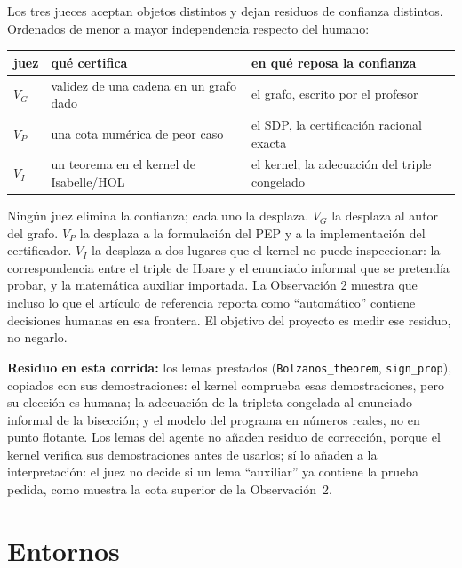 \documentclass[11pt,a4paper]{article}
\begin{document}
Los tres jueces aceptan objetos distintos y dejan residuos de confianza distintos. Ordenados de menor a mayor independencia respecto del humano:

\begin{center}
\begin{tabular}{@{}lll@{}}
\toprule
juez & qué certifica & en qué reposa la confianza \\
\midrule
$V_G$ & validez de una cadena en un grafo dado & el grafo, escrito por el profesor \\
$V_P$ & una cota numérica de peor caso & el SDP, la certificación racional exacta \\
$V_I$ & un teorema en el kernel de Isabelle/HOL & el kernel; la adecuación del triple congelado \\
\bottomrule
\end{tabular}
\end{center}

Ningún juez elimina la confianza; cada uno la desplaza. $V_G$ la desplaza al autor del grafo. $V_P$ la desplaza a la formulación del PEP y a la implementación del certificador. $V_I$ la desplaza a dos lugares que el kernel no puede inspeccionar: la correspondencia entre el triple de Hoare y el enunciado informal que se pretendía probar, y la matemática auxiliar importada. La Observación 2 muestra que incluso lo que el artículo de referencia reporta como ``automático'' contiene decisiones humanas en esa frontera. El objetivo del proyecto es medir ese residuo, no negarlo.

\textbf{Residuo en esta corrida:} los lemas prestados (\texttt{Bolzanos\_\allowbreak{}theorem}, \texttt{sign\_\allowbreak{}prop}), copiados con sus demostraciones: el kernel comprueba esas demostraciones, pero su elección es humana; la adecuación de la tripleta congelada al enunciado informal de la bisección; y el modelo del programa en números reales, no en punto flotante. Los lemas del agente no añaden residuo de corrección, porque el kernel verifica sus demostraciones antes de usarlos; sí lo añaden a la interpretación: el juez no decide si un lema ``auxiliar'' ya contiene la prueba pedida, como muestra la cota superior de la Observación~2.

\section{Entornos}
\end{document}
